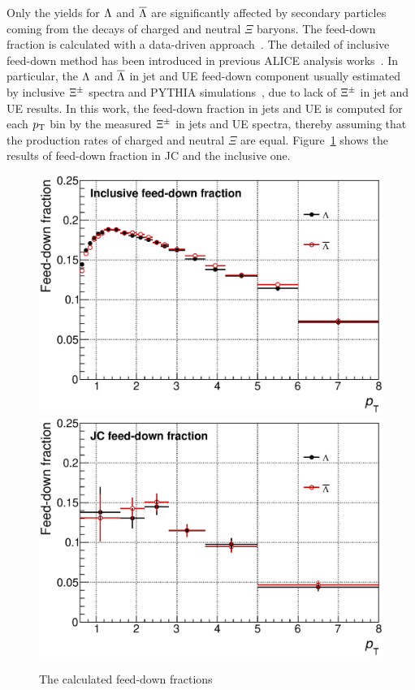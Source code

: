Only the yields for $\Lambda$ and $\overline{\Lambda}$ are significantly affected by secondary particles coming from the decays of charged and neutral $\Xi$ baryons. The feed-down fraction is calculated with a data-driven approach~\cite{Abelev:2013haa}. The detailed of inclusive feed-down method has been introduced in previous ALICE analysis works~\cite{Acharya:2019kyh, Acharya:2020uxl, ALICE:2017jyt}. In particular, the $\Lambda$ and $\overline{\Lambda}$ in jet and UE feed-down component usually estimated by inclusive $\Xi^{\pm}$ spectra and PYTHIA simulations~\cite{V0injet}, due to lack of $\Xi^{\pm}$ in jet and UE results. In this work, the feed-down fraction in jets and UE is computed for each $p_{\rm T}$ bin by the measured $\Xi^{\pm}$ in jets and UE spectra, thereby assuming that the production rates of charged and neutral $\Xi$ are equal. Figure~\ref{Fig:FdFrac} shows the results of feed-down fraction in JC and the inclusive one.
 \begin{figure}[!ht]
 	\begin{center}
 		\includegraphics[width=.48\textwidth]{figures/Fd_Incl}
 		\includegraphics[width=.48\textwidth]{figures/Fd_JC}
 	\end{center}
 	\caption{The calculated feed-down fractions}
 	\label{Fig:FdFrac}
 \end{figure}
 
